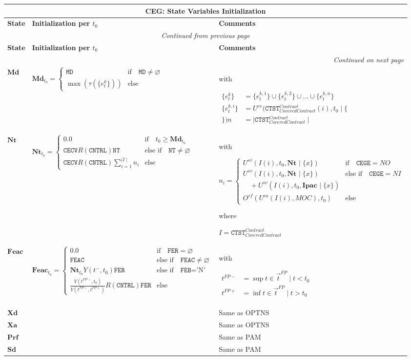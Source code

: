 \documentclass[9pt,oneside]{amsart}
\newenvironment{states}[1]{
	\hfill %
	\begin{longtable}{| p{0.05\textwidth} | p{0.48\textwidth} |  p{0.43\textwidth} |}
	\multicolumn{3}{c}{\textbf{#1: State Variables Initialization}}\\
	\hline
	\textbf{State} & \textbf{Initialization per $t_0$} & \textbf{Comments} \\
	\hline
	\endfirsthead
	\multicolumn{3}{c}{\textit{Continued from previous page}} \\
	\hline
	\textbf{State} & \textbf{Initialization per $t_0$} & \textbf{Comments} \\
	\hline
	\endhead
	\hline \multicolumn{3}{r}{\textit{Continued on next page}} \\
	\endfoot
	\endlastfoot
}{%
	\hline
	\end{longtable}
}
\newcommand{\svar}[2]{\textbf{#1}_{#2}}
\newcommand{\attr}[1]{\texttt{#1}}
\newcommand{\sgn}{R(\attr{CNTRL})}
\newcommand{\yfr}[2]{Y(#1,#2)}
\newcommand{\obs}[3]{O^{#1}(#2,#3)}
\newcommand{\cldev}[3]{U^{ev}(#1,#2 \mid\{#3\})}
\newcommand{\cldsv}[4]{U^{sv}(#1,#2,\svar{#3}{} \mid\{#4\})}
\newcommand{\cldca}[2]{U^{ca}(#1,#2)}
\newcommand{\undef}{\varnothing}
\newcommand{\tev}[1]{\tau(#1)}
\begin{document}
\begin{states}{CEG}
	$\svar{Md}{}$ & $\svar{Md}{t_0}=\begin{cases} \attr{MD} & \text{if}\quad \attr{MD}\neq\undef \\
				\max(\tev{\{e_t^k\}}) & \text{else} \end{cases}$
				& with\par
					{$\begin{aligned}
						\{e_t^k\} &= \{e_t^{k,1}\}\cup\{e_t^{k,2}\}\cup ...\cup\{e_t^{k,n}\} \\
						\{e_t^{k,i}\} &= \cldev{\attr{CTST}_{CoveredContract}^{Contract}(i)}{t_0}\\
						n &= \mid \attr{CTST}_{CoveredContract}^{Contract} \mid \end{aligned}$} \\
	\hline
	$\svar{Nt}{}$ & $\svar{Nt}{t_0} = \begin{cases}
							0.0 & \text{if}\quad t_0\geq\svar{Md}{t_0} \\
							\attr{CECV}\sgn\attr{NT} & \text{else if}\quad \attr{NT}\neq\undef \\
							\attr{CECV}\sgn\sum_{i=1}^{\mid I\mid} n_i & \text{else} \end{cases}$ & with\par
			$n_i=\begin{cases} \cldsv{I(i)}{t_0}{Nt}{x} & \text{if}\quad \attr{CEGE}=NO \\
					\cldsv{I(i)}{t_0}{Nt}{x} & \text{else if}\quad \attr{CEGE}=NI \\
					\quad + \cldsv{I(i)}{t_0}{Ipac}{x} & \\
					\obs{rf}{\cldca{I(i)}{MOC}}{t_0} & \text{else} \end{cases}$ \par
	where\par
	$I=\attr{CTST}_{CoveredContract}^{Contract}$ \\
	\hline
	$\svar{Feac}{}$ & $\svar{Feac}{t_0} = \begin{cases} 0.0 & \text{if} \quad \attr{FER}=\undef \\
					\attr{FEAC} & \text{else if} \quad \attr{FEAC} \neq \undef \\
					\svar{Nt}{t_0}\yfr{t^-}{t_0}\attr{FER} & \text{else if} \quad \attr{FEB}=\text{'N'} \\
					\frac{\yfr{t^{FP-}}{t_0}}{\yfr{t^{FP-}}{t^{FP+}}}\sgn\attr{FER} & \text{else} \end{cases}$ &
			with\par
			{$\begin{aligned}
						t^{FP-} &= \sup t \in \vec{t}^{FP}\mid t<t_0 \\
						t^{FP+} &= \inf t \in \vec{t}^{FP}\mid t>t_0 \end{aligned}$} \\
  	\hline
	$\svar{Xd}{}$ & & Same as OPTNS \\
	\hline
	$\svar{Xa}{}$ & & Same as OPTNS \\
	\hline
	$\svar{Prf}{}$ & & Same as PAM \\
	\hline
	$\svar{Sd}{}$ & & Same as PAM \\
\end{states}
\end{document}
